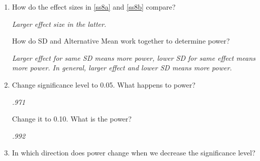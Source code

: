 \begin{enumerate}
    What is your effect size?
\begin{students}
 \vspace{1cm} %
\end{students}

\begin{key}
  {\it $(2.9 - 0)/2 = 2.9/2 = 1.45$}
\end{key}

  \item   How do the effect sizes in \ref{ss8a} and \ref{ss8b} compare?  
\begin{students}
 \vspace{1cm} %
\end{students}

\begin{key}
  {\it Larger effect  size in the latter. }
\end{key}



    How do SD and Alternative Mean work together to determine power? 
\begin{students}
 \vspace{2cm}
\end{students}

\begin{key}
  {\it     Larger effect for same SD means more power, lower SD for same
    effect means more power.  In general, larger effect and lower
    SD means more power. }
\end{key}


  \item  Change significance level to 0.05.  What happens to power?
\begin{students}
 \vspace{1cm} 
\end{students}

\begin{key}
  {\it  .971}
\end{key}


    Change it to 0.10. What is the power? 
\begin{students}
 \vspace{1cm}%
\end{students}

\begin{key}
  {\it .992}
\end{key}

  \item    In which direction does power change when we decrease the
    significance level?  
\begin{students}
 \vspace{3cm}
\end{students}


\end{enumerate}
